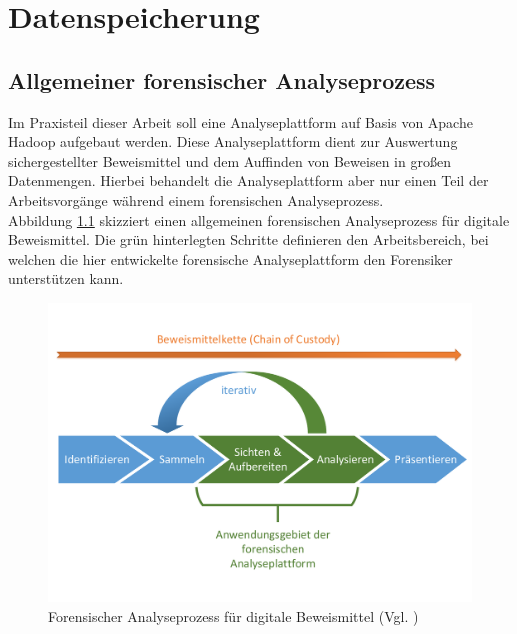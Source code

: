 \chapter{Datenspeicherung}
\label{ch:data_persistence}

\section{Allgemeiner forensischer Analyseprozess}
Im Praxisteil dieser Arbeit soll eine Analyseplattform auf Basis von Apache Hadoop aufgebaut werden. Diese Analyseplattform dient zur Auswertung sichergestellter Beweismittel und dem Auffinden von Beweisen in großen Datenmengen. Hierbei behandelt die Analyseplattform aber nur einen Teil der Arbeitsvorgänge während einem forensischen Analyseprozess.\\

\noindent
Abbildung \ref{fig:digital_forensics_process} skizziert einen allgemeinen forensischen Analyseprozess für digitale Beweismittel.\cite[S.16]{digital_forensics} Die grün hinterlegten Schritte definieren den Arbeitsbereich, bei welchen die hier entwickelte forensische Analyseplattform den Forensiker unterstützen kann.\\ 
\begin{figure}[ht]
  \centering
  \includegraphics[width=\textwidth]{./resource/digital_forensics_process.pdf}
  \caption{Forensischer Analyseprozess für digitale Beweismittel (Vgl. \cite[S.16]{digital_forensics})}
  \label{fig:digital_forensics_process}
\end{figure}


